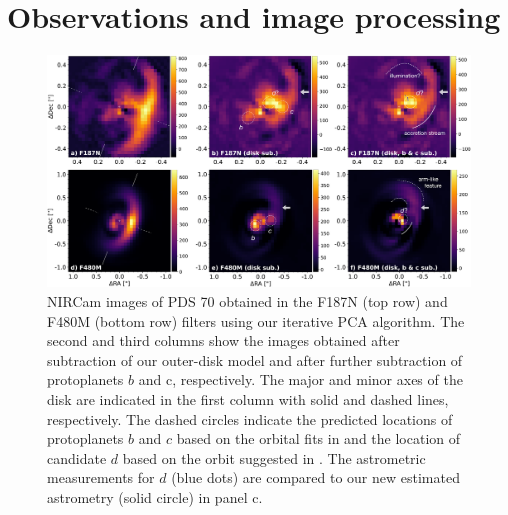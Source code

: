 \documentclass[longauth]{aa}
\begin{document}
\section{Observations and image processing} \label{sec:obs}
    \label{sec:image_proc}

       \begin{figure}[!t]
    \centering
    \includegraphics[width=\textwidth]{Fig1_v10.pdf}
    \caption{%
    NIRCam images of PDS 70 obtained in the F187N (top row) and F480M (bottom row) filters %
    using our iterative PCA algorithm. %
    The second and third columns show the images obtained after subtraction of our outer-disk model %
    and after further subtraction of protoplanets $b$ and c, respectively. The major and minor axes of the disk are indicated in the first column with solid and dashed lines, respectively. The dashed circles indicate the predicted locations of protoplanets $b$ and $c$ based on the orbital fits in \citet{Wang2021} and the location of candidate $d$ based on the orbit suggested in . The astrometric measurements for $d$ (blue dots) are compared to our new estimated astrometry (solid circle) in panel c. 
}
\end{figure}
\end{document}

